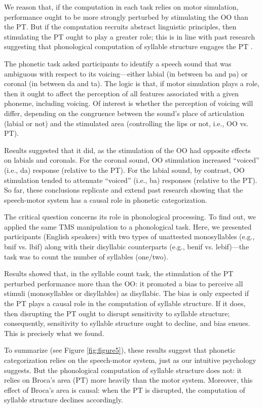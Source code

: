 \documentclass[output=paper,colorlinks,citecolor=brown
]{langscibook}
\begin{document}
We reason that, if the computation in each task relies on motor simulation, performance ought to be more strongly perturbed by stimulating the OO than the PT. But if the computation recruits abstract linguistic principles, then stimulating the PT ought to play a greater role; this is in line with past research suggesting that phonological computation of syllable structure engages the PT \citep{berent2014language}.

The phonetic task asked participants to identify a speech sound that was ambiguous with respect to its voicing—either labial (in between ba and pa) or coronal (in between da and ta). The logic is that, if motor simulation plays a role, then it ought to affect the perception of all features associated with a given phoneme, including voicing. Of interest is whether the perception of voicing will differ, depending on the congruence between the sound’s place of articulation (labial or not) and the stimulated area (controlling the lips or not, i.e., OO vs. PT). 

Results suggested that it did, as the stimulation of the OO had opposite effects on labials and coronals. For the coronal sound, OO stimulation increased “voiced” (i.e., da) response (relative to the PT). For the labial sound, by contrast, OO stimulation tended to attenuate “voiced” (i.e., ba) responses (relative to the PT). So far, these conclusions replicate and extend past research showing that the speech-motor system has a causal role in phonetic categorization.

The critical question concerns its role in phonological processing. To find out, we applied the same TMS manipulation to a phonological task. Here, we presented participants (English speakers) with two types of unattested monosyllables (e.g., bnif vs. lbif) along with their disyllabic counterparts (e.g., benif vs. lebif)—the task was to count the number of syllables (one/two). 

Results showed that, in the syllable count task, the stimulation of the PT perturbed performance more than the OO: it promoted a bias to perceive all stimuli (monosyllables or disyllables) as disyllabic. The bias is only expected if the PT plays a causal role in the computation of syllable structure. If it does, then disrupting the PT ought to disrupt sensitivity to syllable structure; consequently, sensitivity to syllable structure ought to decline, and bias ensues. This is precisely what we found.

To summarize (see Figure \ref{fig:figure5}), these results suggest that phonetic categorization relies on the speech-motor system, just as our intuitive psychology suggests. But the phonological computation of syllable structure does not: it relies on Broca’s area (PT) more heavily than the motor system. Moreover, this effect of Broca’s area is causal: when the PT is disrupted, the computation of syllable structure declines accordingly.
\end{document}

